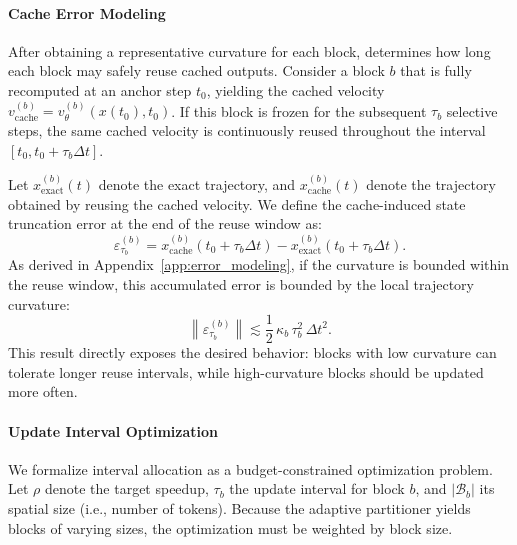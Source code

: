 \paragraph{Cache Error Modeling}
After obtaining a representative curvature for each block, \cubic determines how long each block may safely reuse cached outputs. Consider a block $b$ that is fully recomputed at an anchor step $t_0$, yielding the cached velocity $v_{\text{cache}}^{(b)} = v_\theta^{(b)}(x(t_0), t_0)$. If this block is frozen for the subsequent $\tau_b$ selective steps, the same cached velocity is continuously reused throughout the interval $[t_0, t_0+\tau_b \Delta t]$.

Let $x_{\text{exact}}^{(b)}(t)$ denote the exact trajectory, and $x_{\text{cache}}^{(b)}(t)$ denote the trajectory obtained by reusing the cached velocity. We define the cache-induced state truncation error at the end of the reuse window as:
\begin{equation}
    \varepsilon_{\tau_b}^{(b)} = x_{\text{cache}}^{(b)}(t_0 + \tau_b \Delta t) - x_{\text{exact}}^{(b)}(t_0 + \tau_b \Delta t).
    \label{eq:error_def}
\end{equation}
As derived in Appendix~\ref{app:error_modeling}, if the curvature is bounded within the reuse window, this accumulated error is bounded by the local trajectory curvature:
\begin{equation}
    \label{eq:error_bound}
    \left\|\varepsilon_{\tau_b}^{(b)}\right\|
    \lesssim
    \frac{1}{2}\,\kappa_b\,\tau_b^2\,\Delta t^2.
\end{equation}
This result directly exposes the desired behavior: blocks with low curvature can tolerate longer reuse intervals, while high-curvature blocks should be updated more often.

\paragraph{Update Interval Optimization} 
\label{sec:optimizer}

We formalize interval allocation as a budget-constrained optimization problem. Let $\rho$ denote the target speedup, $\tau_b$ the update interval for block $b$, and $|\mathcal{B}_b|$ its spatial size (i.e., number of tokens). Because the adaptive partitioner yields blocks of varying sizes, the optimization must be weighted by block size.

